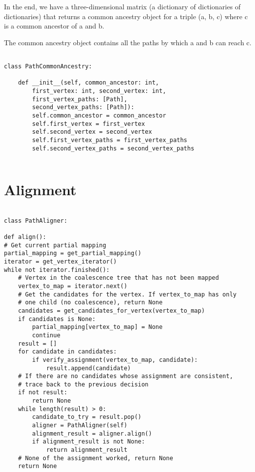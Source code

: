 \documentclass[14pt]{extarticle}
\begin{document}
In the end, we have a three-dimensional matrix (a dictionary of dictionaries of dictionaries) that returns a common ancestry object for a triple (a, b, c) where c is a common ancestor of a and b.

The common ancestry object contains all the paths by which a and b can reach c.

\begin{lstlisting}

class PathCommonAncestry:
	
	def __init__(self, common_ancestor: int,
		first_vertex: int, second_vertex: int,
		first_vertex_paths: [Path],
		second_vertex_paths: [Path]):
		self.common_ancestor = common_ancestor
		self.first_vertex = first_vertex
		self.second_vertex = second_vertex
		self.first_vertex_paths = first_vertex_paths
		self.second_vertex_paths = second_vertex_paths
	

\end{lstlisting}

\newpage

\section{Alignment}

\vspace*{-\baselineskip}

\begin{lstlisting}

class PathAligner:

def align():
# Get current partial mapping
partial_mapping = get_partial_mapping()
iterator = get_vertex_iterator()
while not iterator.finished():
	# Vertex in the coalescence tree that has not been mapped
	vertex_to_map = iterator.next()
	# Get the candidates for the vertex. If vertex_to_map has only
	# one child (no coalescence), return None
	candidates = get_candidates_for_vertex(vertex_to_map)
	if candidates is None:
		partial_mapping[vertex_to_map] = None
		continue
	result = []
	for candidate in candidates:
		if verify_assignment(vertex_to_map, candidate):
			result.append(candidate)
	# If there are no candidates whose assignment are consistent,
	# trace back to the previous decision
	if not result:
		return None			
	while length(result) > 0:
		candidate_to_try = result.pop()
		aligner = PathAligner(self)
		alignment_result = aligner.align()
		if alignment_result is not None:
			return alignment_result
	# None of the assignment worked, return None
	return None
\end{lstlisting}
\end{document}
